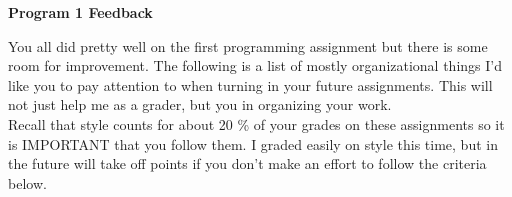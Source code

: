 \documentclass[8pt]{article}
\begin{document}
\begin{center}
\textbf{Program 1 Feedback}
\end{center}

You all did pretty well on the first programming assignment but there is some room for improvement.  The following is a list of mostly organizational things I'd like you to pay attention to when turning in your future assignments.  This will not just help me as a grader, but you in organizing your work.\\

Recall that style counts for about 20 \% of your grades on these assignments so it is IMPORTANT that you follow them.  I graded easily on style this time, but in the future will take off points if you don't make an effort to follow the criteria below.\\
\end{document}
